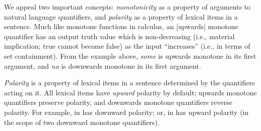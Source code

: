 We appeal two important concepts: \textit{monotonicity} as a
  property of arguments to natural language quantifiers,
  and \textit{polarity}
  as a property of lexical items in a sentence.
Much like monotone functions in calculus,
  an [upwards] monotone quantifier has an output truth value which is
  non-decreasing (i.e., material implication; true cannot become false)
  as the input ``increases'' (i.e., in terms of set containment).
From the example above, \textit{some} is upwards monotone in its first
  argument, and \textit{no} is downwards monotone in its first argument.

%

\textit{Polarity} is
  a property of lexical items in a sentence determined by the
  quantifiers acting on it.
All lexical items have \textit{upward} polarity by default;
  upwards monotone quantifiers preserve polarity,
  and downwards monotone quantifiers reverse polarity.
For example,  in  has downward polarity; or,
   in  has upward polarity
  (in the scope of two downward monotone quantifiers).

